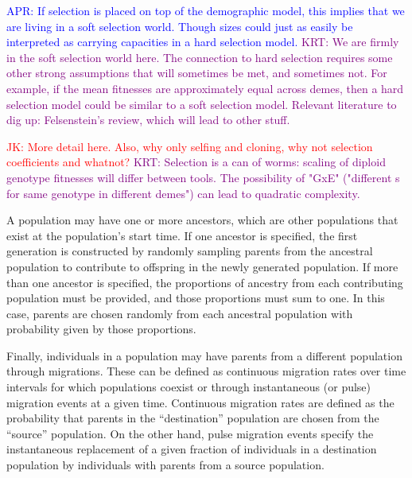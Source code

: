 \documentclass[11pt]{article}
\newcommand{\aprcomment}[1]{{\textcolor{blue}{APR: #1}}}
\newcommand{\jkcomment}[1]{{\textcolor{red}{JK: #1}}}
\newcommand{\krtcomment}[1]{{\textcolor{purple}{KRT: #1}}}
\begin{document}
\aprcomment{If selection is placed on top of the demographic model, this implies
that we are living in a soft selection world. Though sizes could just as easily
be interpreted as carrying capacities in a hard selection model.}
\krtcomment{We are firmly in the soft selection world here.  The connection to hard selection
requires some other strong assumptions that will sometimes be met, and sometimes not.
For example, if the mean fitnesses are approximately equal across demes, then a hard selection
model could be similar to a soft selection model.  Relevant literature to dig up: Felsenstein's review,
which will lead to other stuff.}

\jkcomment{More detail here. Also, why only selfing and cloning, why not selection
coefficients and whatnot?}
\krtcomment{Selection is a can of worms: scaling of diploid genotype fitnesses will differ between tools.
The possibility of "GxE" ("different s for same genotype in different demes") can lead to quadratic complexity.}

A population may have one
or more ancestors, which are other populations that exist at the population's
start time. If one ancestor is specified, the first generation is constructed
by randomly sampling parents from the ancestral population to contribute to
offspring in the newly generated population. If more than one ancestor is
specified, the proportions of ancestry from each contributing population must
be provided, and those proportions must sum to one. In this case, parents are
chosen randomly from each ancestral population with probability given by those
proportions.

Finally, individuals in a population may have parents from a different
population through migrations. These can be defined as continuous migration
rates over time intervals for which populations coexist or through
instantaneous (or pulse) migration events at a given time. Continuous migration
rates are defined as the probability that parents in the ``destination''
population are chosen from the ``source'' population.
On the other hand, pulse
migration events specify the instantaneous replacement of a given fraction of
individuals in a destination population by individuals with parents from a
source population.
\end{document}
